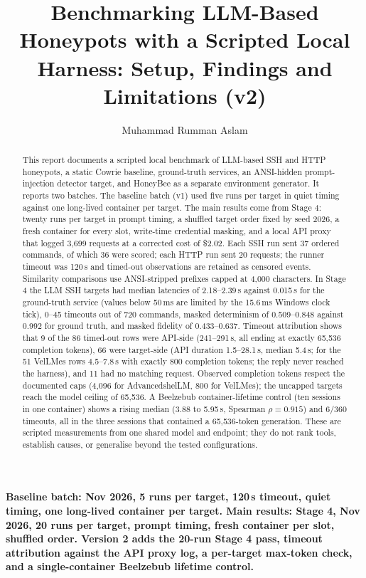 \documentclass[a4paper,11pt]{article}
\title{\textbf{Benchmarking LLM-Based Honeypots with a Scripted Local Harness:
Setup, Findings and Limitations (v2)}}
\author{Muhammad Rumman Aslam}
\date{}
\begin{document}
\maketitle

\begin{center}
\textbf{Baseline batch: Nov 2026, 5 runs per target, 120\,s timeout, quiet
timing, one long-lived container per target. Main results: Stage 4, Nov 2026,
20 runs per target, prompt timing, fresh container per slot, shuffled order.
Version 2 adds the 20-run Stage 4 pass, timeout attribution against the API
proxy log, a per-target max-token check, and a single-container
Beelzebub lifetime control.}
\end{center}

\begin{abstract}
This report documents a scripted local benchmark of LLM-based SSH and HTTP
honeypots, a static Cowrie baseline, ground-truth services, an ANSI-hidden
prompt-injection detector target, and HoneyBee as a separate environment
generator. It reports two batches. The baseline batch (v1) used five runs per
target in quiet timing against one long-lived container per target. The main
results come from Stage 4: twenty runs per target in prompt timing, a shuffled
target order fixed by seed 2026, a fresh container for every slot, write-time
credential masking, and a local API proxy that logged 3,699 requests at a
corrected cost of \$2.02. Each SSH run sent 37 ordered commands, of which 36
were scored; each HTTP run sent 20 requests; the runner timeout was 120\,s and
timed-out observations are retained as censored events. Similarity comparisons
use ANSI-stripped prefixes capped at 4,000 characters. In Stage 4 the LLM SSH
targets had median latencies of 2.18--2.39\,s against 0.015\,s for the
ground-truth service (values below 50\,ms are limited by the 15.6\,ms Windows
clock tick), 0--45 timeouts out of 720 commands, masked determinism of
0.509--0.848 against 0.992 for ground truth, and masked fidelity of
0.433--0.637. Timeout attribution shows that 9 of the 86 timed-out rows were
API-side (241--291\,s, all ending at exactly 65,536 completion tokens), 66 were
target-side (API duration 1.5--28.1\,s, median 5.4\,s; for the 51 VelLMes rows
4.5--7.8\,s with exactly 800 completion tokens; the reply never reached the
harness), and 11 had no matching request. Observed completion tokens respect
the documented caps (4,096 for AdvancedshelLM, 800 for VelLMes); the uncapped
targets reach the model ceiling of 65,536. A Beelzebub container-lifetime
control (ten sessions in one container) shows a rising median (3.88 to
5.95\,s, Spearman $\rho=0.915$) and 6/360 timeouts, all in the three sessions
that contained a 65,536-token generation. These are scripted measurements from
one shared model and endpoint; they do not rank tools, establish causes, or
generalise beyond the tested configurations.
\end{abstract}
\end{document}
